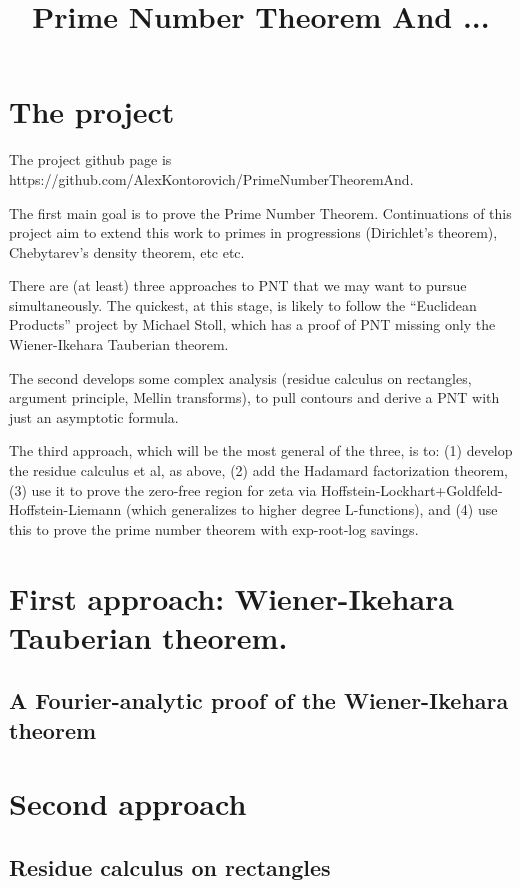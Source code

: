 \documentclass{report}
\title{Prime Number Theorem And ...}
\theoremstyle{definition}
\begin{document}
\maketitle

\chapter{The project}

The project github page is https://github.com/AlexKontorovich/PrimeNumberTheoremAnd.

The first main goal is to prove the Prime Number Theorem. Continuations of this project aim to extend
this work to primes in progressions (Dirichlet's theorem), Chebytarev's density theorem, etc
etc.

There are (at least) three approaches to PNT that we may want to pursue simultaneously. The quickest, at this stage, is likely to 
follow
 the ``Euclidean Products'' project by Michael Stoll, which has a proof of PNT missing only the Wiener-Ikehara Tauberian theorem. 

The second develops some complex analysis (residue calculus on rectangles, argument principle, Mellin transforms), to pull contours and derive a PNT with just an asymptotic formula.

The third approach, which will be the most general of the three, is to: (1) develop the residue calculus et al, as above, (2) add the Hadamard factorization theorem, (3) use it to prove the zero-free region for zeta via Hoffstein-Lockhart+Goldfeld-Hoffstein-Liemann (which generalizes to higher degree L-functions), and (4) use this to prove the prime number theorem with exp-root-log savings.

\chapter{First approach: Wiener-Ikehara Tauberian theorem.}

\section{A Fourier-analytic proof of the Wiener-Ikehara theorem}


\chapter{Second approach}

\section{Residue calculus on rectangles}

\end{document}

